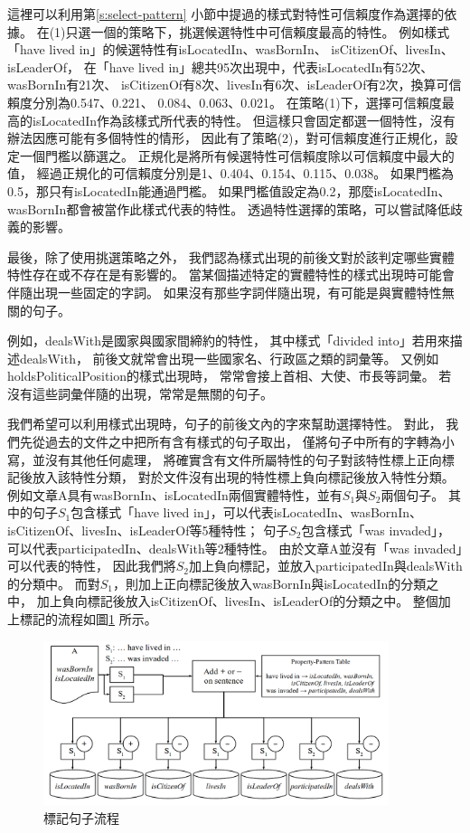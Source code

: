 這裡可以利用第\ref{s:select-pattern} 小節中提過的樣式對特性可信賴度作為選擇的依據。
在(1)只選一個的策略下，挑選候選特性中可信賴度最高的特性。
例如樣式「have lived in」的候選特性有isLocatedIn、wasBornIn、
isCitizenOf、livesIn、isLeaderOf，
在「have lived in」總共95次出現中，代表isLocatedIn有52次、wasBornIn有21次、
isCitizenOf有8次、livesIn有6次、isLeaderOf有2次，換算可信賴度分別為0.547、0.221、
0.084、0.063、0.021。
在策略(1)下，選擇可信賴度最高的isLocatedIn作為該樣式所代表的特性。
但這樣只會固定都選一個特性，沒有辦法因應可能有多個特性的情形，
因此有了策略(2)，對可信賴度進行正規化，設定一個門檻以篩選之。
正規化是將所有候選特性可信賴度除以可信賴度中最大的值，
經過正規化的可信賴度分別是1、0.404、0.154、0.115、0.038。
如果門檻為0.5，那只有isLocatedIn能通過門檻。
如果門檻值設定為0.2，那麼isLocatedIn、wasBornIn都會被當作此樣式代表的特性。
透過特性選擇的策略，可以嘗試降低歧義的影響。

最後，除了使用挑選策略之外，
我們認為樣式出現的前後文對於該判定哪些實體特性存在或不存在是有影響的。
當某個描述特定的實體特性的樣式出現時可能會伴隨出現一些固定的字詞。
如果沒有那些字詞伴隨出現，有可能是與實體特性無關的句子。

例如，dealsWith是國家與國家間締約的特性，
其中樣式「divided into」若用來描述dealsWith，
前後文就常會出現一些國家名、行政區之類的詞彙等。
又例如holdsPoliticalPosition的樣式出現時，
常常會接上首相、大使、市長等詞彙。
若沒有這些詞彙伴隨的出現，常常是無關的句子。

我們希望可以利用樣式出現時，句子的前後文內的字來幫助選擇特性。
對此，
我們先從過去的文件之中把所有含有樣式的句子取出，
僅將句子中所有的字轉為小寫，並沒有其他任何處理，
將確實含有文件所屬特性的句子對該特性標上正向標記後放入該特性分類，
對於文件沒有出現的特性標上負向標記後放入特性分類。
例如文章A具有wasBornIn、isLocatedIn兩個實體特性，並有$S_1$與$S_2$兩個句子。
其中的句子$S_1$包含樣式「have lived in」，可以代表isLocatedIn、wasBornIn、
isCitizenOf、livesIn、isLeaderOf等5種特性；
句子$S_2$包含樣式「was invaded」，可以代表participatedIn、dealsWith等2種特性。
由於文章A並沒有「was invaded」可以代表的特性，
因此我們將$S_2$加上負向標記，並放入participatedIn與dealsWith的分類中。
而對$S_1$，則加上正向標記後放入wasBornIn與isLocatedIn的分類之中，
加上負向標記後放入isCitizenOf、livesIn、isLeaderOf的分類之中。
整個加上標記的流程如圖\ref{i:tagging} 所示。

\begin{figure}
    \centering
    \includegraphics[width=0.9\textwidth]{images/03-tagging}
    \caption{標記句子流程}
    \label{i:tagging}
\end{figure}

